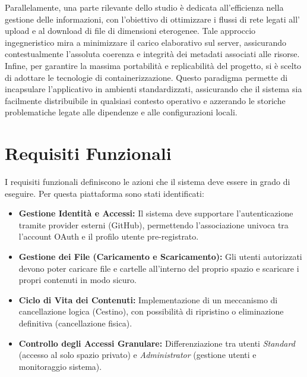 \documentclass[12pt,a4paper]{report}
\begin{document}
Parallelamente, una parte rilevante dello studio è dedicata
all'efficienza nella gestione delle informazioni, con l'obiettivo di
ottimizzare i flussi di rete legati all' upload e al download di file
di dimensioni eterogenee. Tale approccio ingegneristico mira a
minimizzare il carico elaborativo sul server, assicurando
contestualmente l'assoluta coerenza e integrità dei metadati
associati alle risorse. Infine, per garantire la massima portabilità
e replicabilità del progetto, si è scelto di adottare le tecnologie
di containerizzazione. Questo paradigma permette di incapsulare
l'applicativo in ambienti standardizzati, assicurando che il sistema
sia facilmente distribuibile in qualsiasi contesto operativo e
azzerando le storiche problematiche legate alle dipendenze e alle
configurazioni locali.

\newpage
\section*{Requisiti Funzionali}
I requisiti funzionali definiscono le azioni che il sistema deve essere in
grado di eseguire. Per questa piattaforma sono stati identificati:
\begin{itemize}
  \item \textbf{Gestione Identità e Accessi:} Il sistema deve supportare
    l'autenticazione tramite provider esterni (GitHub), permettendo
    l'associazione univoca tra l'account OAuth e il profilo utente
    pre-registrato.
  \item \textbf{Gestione dei File (Caricamento e Scaricamento):} Gli
    utenti autorizzati devono poter caricare file e cartelle
    all'interno del proprio spazio e scaricare i propri contenuti in
    modo sicuro.
  \item \textbf{Ciclo di Vita dei Contenuti:} Implementazione di un
    meccanismo di cancellazione logica (Cestino), con possibilità di
    ripristino o eliminazione definitiva (cancellazione fisica).
  \item \textbf{Controllo degli Accessi Granulare:} Differenziazione tra
    utenti \textit{Standard} (accesso al solo spazio privato) e
    \textit{Administrator} (gestione utenti e monitoraggio sistema).
\end{itemize}
\end{document}
